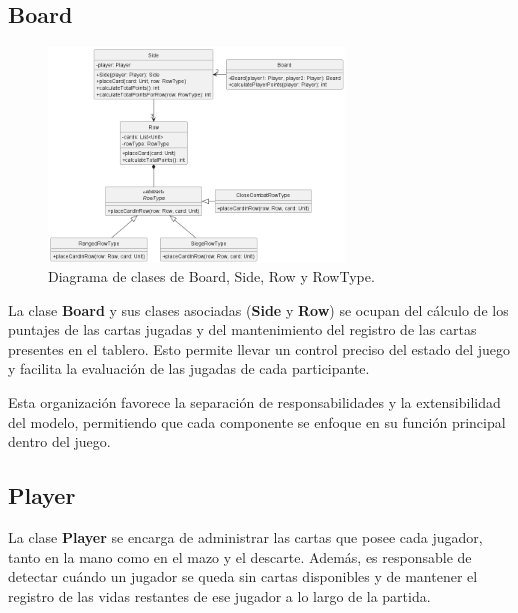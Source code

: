\documentclass[titlepage,a4paper]{article}
\begin{document}
\subsection*{Board}

\begin{figure}[H]
    \centering
    \includegraphics[width=0.7\textwidth]{../../../diagrams/classes/board.png}
    \caption{Diagrama de clases de Board, Side, Row y RowType.}
\end{figure}

La clase \textbf{Board} y sus clases asociadas (\textbf{Side} y \textbf{Row}) se ocupan del cálculo de los puntajes de las cartas jugadas y del mantenimiento del registro de las cartas presentes en el tablero. Esto permite llevar un control preciso del estado del juego y facilita la evaluación de las jugadas de cada participante.

Esta organización favorece la separación de responsabilidades y la extensibilidad del modelo, permitiendo que cada componente se enfoque en su función principal dentro del juego.

\subsection*{Player}
La clase \textbf{Player} se encarga de administrar las cartas que posee cada jugador, tanto en la mano como en el mazo y el descarte. Además, es responsable de detectar cuándo un jugador se queda sin cartas disponibles y de mantener el registro de las vidas restantes de ese jugador a lo largo de la partida.
\end{document}
